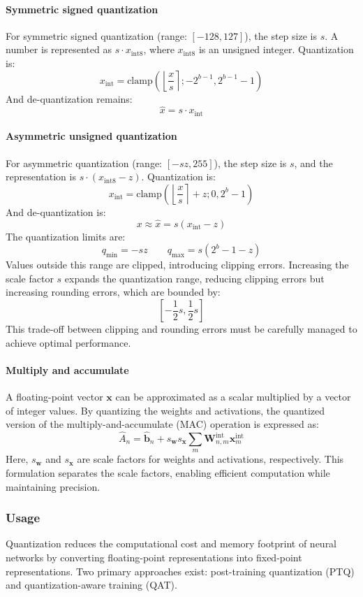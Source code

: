 \paragraph*{Symmetric signed quantization}
For symmetric signed quantization (range: $[-128, 127]$), the step size is $s$.
A number is represented as $s\cdot x_{\text{int8}}$, where $x_{\text{int8}}$ is an unsigned integer. 
Quantization is:
\[x_{\text{int}}=\text{clamp}\left(\left\lfloor \dfrac{x}{s}\right\rceil;-2^{b-1},2^{b-1}-1 \right)\]
\noindent And de-quantization remains:
\[\hat{x}=s\cdot x_{\text{int}}\]

\paragraph*{Asymmetric unsigned quantization}
For asymmetric quantization (range: $[-sz,255]$), the step size is $s$, and the representation is $s\cdot (x_{\text{int8}}-z)$. 
Quantization is:
\[x_{\text{int}}=\text{clamp}\left(\left\lfloor \dfrac{x}{s}\right\rceil+z;0,2^b-1 \right)\]
\noindent And de-quantization is:
\[x\approx\hat{x}=s(x_{\text{int}}-z)\]
\noindent The quantization limits are:
\[q_{\min}=-sz\qquad q_{\max}=s(2^b-1-z)\]
Values outside this range are clipped, introducing clipping errors. 
Increasing the scale factor $s$ expands the quantization range, reducing clipping errors but increasing rounding errors, which are bounded by:
\[\left[-\dfrac{1}{2}s,\dfrac{1}{2}s\right]\]
\noindent This trade-off between clipping and rounding errors must be carefully managed to achieve optimal performance.

\paragraph*{Multiply and accumulate}
A floating-point vector $\mathbf{x}$ can be approximated as a scalar multiplied by a vector of integer values.
By quantizing the weights and activations, the quantized version of the multiply-and-accumulate (MAC) operation is expressed as:
\[\hat{A}_n=\hat{\textbf{b}}_n+s_{\textbf{w}}s_{\textbf{x}}\sum_m\textbf{W}_{n,m}^{\text{int}}\textbf{x}_m^{\text{int}}\]
Here, $s_{\textbf{w}}$ and $s_{\textbf{x}}$ are scale factors for weights and activations, respectively. 
This formulation separates the scale factors, enabling efficient computation while maintaining precision.

\subsubsection{Usage}
Quantization reduces the computational cost and memory footprint of neural networks by converting floating-point representations into fixed-point representations. 
Two primary approaches exist: post-training quantization (PTQ) and quantization-aware training (QAT).

